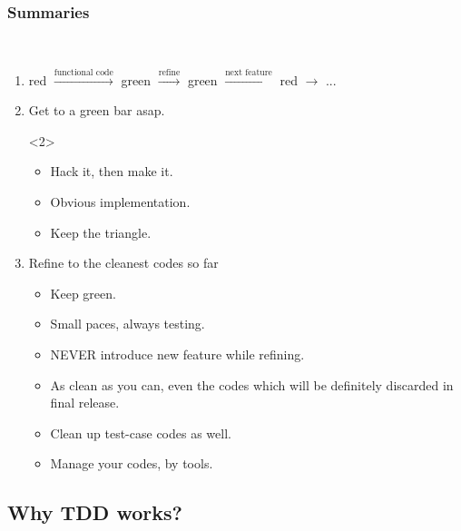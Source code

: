 \documentclass[lualatex]{beamer}
\begin{document}
\begin{frame}[t]
  \frametitle{Summaries}

  \begin{block}{~}
    \begin{enumerate}
    \item 
      red $\xrightarrow{\text{functional code}}$ green $\xrightarrow{\text{refine}}$ green $\xrightarrow{\text{next feature}}$ red $\rightarrow$ ...
    \item<2->
      Get to a green bar asap.
      \begin{onlyenv}<2>
        \begin{itemize}
        \item
          Hack it, then make it.
        \item 
          Obvious implementation.
        \item 
          Keep the triangle.
        \end{itemize}
      \end{onlyenv}
    \item<3>
      Refine to the cleanest codes so far
      \begin{itemize}
      \item
        Keep green.
      \item 
        Small paces, always testing.
      \item
        NEVER introduce new feature while refining.
      \item 
        As clean as you can, even the codes which will be definitely discarded in final release.
      \item 
        Clean up test-case codes as well.
      \item 
        Manage your codes, by tools.
      \end{itemize}
    \end{enumerate}
  \end{block}
\end{frame}

\subsection{Why TDD works?}
\end{document}
